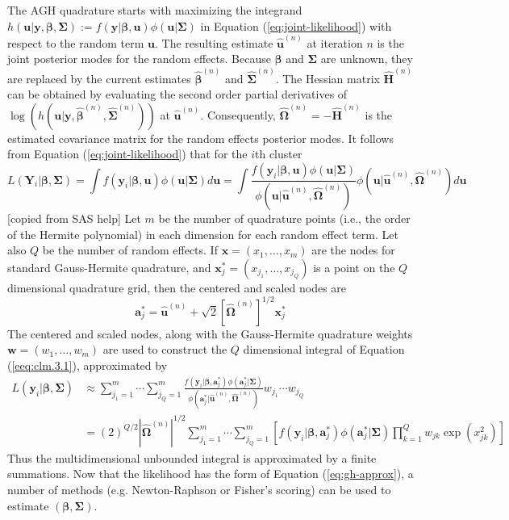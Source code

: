 The AGH quadrature starts with maximizing the integrand $h(\bm u|\bm y, \bm \beta, \bm \Sigma) :=
f(\bm y|\bm \beta, \bm u)\phi(\bm u|\bm \Sigma)$ in Equation (\ref{eq:joint-likelihood}) with
respect to the random term $\bm u$. The resulting estimate $\hat{\bm u}^{(n)}$ at iteration $n$ is
the joint posterior modes for the random effects. Because $\bm \beta$ and $\bm \Sigma$ are unknown,
they are replaced by the current estimates $\hat{\bm \beta}^{(n)}$ and $\hat{\bm \Sigma}^{(n)}$. The
Hessian matrix $\hat{\bm H}^{(n)}$ can be obtained by evaluating the second order partial
derivatives of $\log(h(\bm u|\bm y, \hat{\bm \beta}^{(n)}, \hat{\bm \Sigma}^{(n)}))$ at $\hat{\bm
	u}^{(n)}$. Consequently, $\hat{\bm \Omega}^{(n)} =-\hat{\bm H}^{(n)} $ is the estimated covariance
matrix for the random effects posterior modes. It follows from Equation (\ref{eq:joint-likelihood})
that for the $i$th cluster 
\begin{equation}\label{eeq:clm.3.1}
	L( \bm Y_i|\bm \beta, \bm \Sigma) = \int f(\bm y_i|\bm \beta, \bm u )\phi(\bm u|\bm\Sigma)d\bm u =
	\int \frac{f(\bm y_i|\bm \beta, \bm u )\phi(\bm u|\bm\Sigma)}{\phi(\bm u|\hat{\bm
			u}^{(n)},\hat{\bm \Omega}^{(n)} )}\phi(\bm u|\hat{\bm u}^{(n)},\hat{\bm \Omega}^{(n)} )d\bm u
\end{equation}
[copied from SAS help] Let $m$ be the number of quadrature points (i.e., the order of the Hermite
polynomial) in each dimension for each random effect term. Let also $Q$ be the number of random
effects. If $\bm x = (x_1, \ldots, x_m)$ are the nodes for standard Gauss-Hermite quadrature, and
$\bm x^{\ast}_j=(x_{j_1}, \ldots, x_{j_Q}) $ is a point on the $Q$ dimensional quadrature grid, then
the centered and scaled nodes are 
\begin{equation}\label{1.3.2}
	\bm  a_j^{\ast} = \hat{\bm u}^{(n)} + \sqrt{2} [\hat{\bm \Omega}^{(n)} ]^{1/2}\bm x^{\ast}_j
\end{equation}
The centered and scaled nodes, along with the Gauss-Hermite quadrature weights $\bm w = (w_1,
\ldots, w_m)$ are used to construct the $Q$ dimensional integral of Equation (\ref{eeq:clm.3.1}),
approximated by 
\begin{equation}\label{eq:gh-approx}
	\begin{aligned}
		L(\bm y_i|\bm\beta, \bm \Sigma) &\approx\sum_{j_1=1}^m\cdots \sum_{j_Q=1}^m\frac{f(\bm y_i|\bm
			\beta, \bm  a_j^{\ast})\phi(\bm  a_j^{\ast}|\bm\Sigma)}{\phi(\bm  a_j^{\ast}|\hat{\bm
				u}^{(n)},\hat{\bm \Omega}^{(n)} )}w_{j_1}\cdots w_{j_Q}\\
		& = (2)^{Q/2}|\hat{\bm \Omega}^{(n)}|^{1/2}\sum_{j_1=1}^m\cdots \sum_{j_Q=1}^m\left[ f(\bm y_i|\bm
		\beta, \bm  a_j^{\ast} )\phi(\bm  a_j^{\ast}|\bm\Sigma) \prod_{k=1}^Qw_{jk}\exp(x_{jk}^2)\right]
	\end{aligned}
\end{equation}
Thus the multidimensional unbounded integral is approximated by a finite summations. Now that the
likelihood has the form of Equation (\ref{eq:gh-approx}), a number of methods (e.g. Newton-Raphson
or Fisher's scoring) can be used to estimate $(\bm \beta,  \bm \Sigma)$. 

